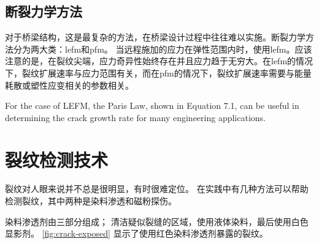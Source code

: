 \subsection{断裂力学方法}
对于桥梁结构，这是最复杂的方法，在桥梁设计过程中往往难以实施。断裂力学方法分为两大类：\acrfull{lefm}和\acrfull{pfm}。 当远程施加的应力在弹性范围内时，使用\acrlong*{lefm}。应该注意的是，在裂纹尖端，应力奇异性始终存在并且应力趋于无穷大。在\acrlong*{lefm}的情况下，裂纹扩展速率与应力范围有关，而在\acrlong*{pfm}的情况下，裂纹扩展速率需要与能量耗散或塑性应变相关的参数相关。\cite{azizinamini1989s}

For the case of LEFM, the Paris Law, shown in Equation 7.1, can be useful in determining the crack growth rate for many engineering applications.

\section{裂纹检测技术}
裂纹对人眼来说并不总是很明显，有时很难定位。 在实践中有几种方法可以帮助检测裂纹，其中两种是染料渗透和磁粉探伤。

染料渗透剂由三部分组成； 清洁疑似裂缝的区域，使用液体染料，最后使用白色显影剂。 \cref{fig:crack-exposed} 显示了使用红色染料渗透剂暴露的裂纹。

